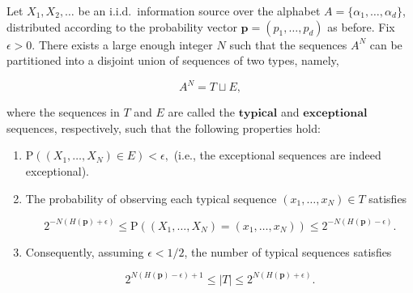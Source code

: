 \begin{thm}
Let $X_1,X_2,\ldots$ be an i.i.d.\ information source
over the alphabet $A=\{\alpha_1,\ldots,\alpha_d\}$,
distributed according to the probability vector
$\mathbf{p}=(p_1,\ldots,p_d)$ as before. Fix
$\epsilon>0$. There exists a large enough integer $N$
such that the sequences $A^N$ can be partitioned into
a disjoint union of sequences of two types, namely,

\[
A^N = T \sqcup E,
\]

\noindent where the sequences in $T$ and $E$ are called the
$\textbf{typical}$ and $\textbf{exceptional}$
sequences, respectively, such that the following
properties hold:

\begin{enumerate}[label=\arabic*.]
\item $\mathrm{P}((X_1,\ldots,X_N) \in E) < \epsilon,$
(i.e., the exceptional sequences are indeed
exceptional).

\item The probability of observing each typical sequence
$(x_1,\ldots,x_N)\in T$ satisfies

\begin{equation*} \tag{26}\label{eq:aep-prob-bound}
2^{-N\left(H(\mathbf{p}) + \epsilon\right)} \le
\mathrm{P}((X_1,\ldots,X_N)=(x_1,\ldots,x_N)) \le
2^{-N\left(H(\mathbf{p}) - \epsilon\right)}.
\end{equation*}

\item Consequently, assuming $\epsilon<1/2$, the number of
typical sequences satisfies

\begin{equation*} \tag{27}\label{eq:aep-numtypical}
2^{N (H(\mathbf{p})-\epsilon)+1} \le |T| \le 2^{N (H(\mathbf{p})+\epsilon)}.
\end{equation*}
\end{enumerate}

\end{thm}

